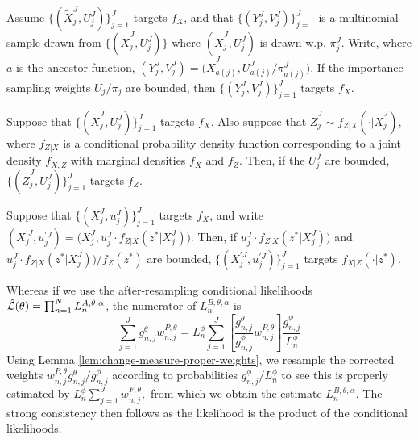 \documentclass[9pt,twoside,lineno]{pnas-new-si}
\begin{document}
\begin{lem}
    \label{lem:change-measure-proper-weights}
    Assume $\{(\tilde X_j^J,U_j^J)\}_{j=1}^J$ targets $f_X$, and that $\{(Y_j^J,V_j^J)\}_{j=1}^J$ is a multinomial sample drawn from $\{(\tilde X_j^J,U_j^J)\}$ where $(\tilde X_j^J,U_j^J)$ is drawn w.p. $\pi^J_j$. Write, where $a$ is the ancestor function,
    $(Y_j^J,V_j^J) = \big(\tilde X^J_{a(j)},U^J_{a(j)}/\pi^J_{a(j)}\big)
    $. If the importance sampling weights $U_j/\pi_j$ are bounded, then $\{(Y^J_j,V^J_j)\}_{j=1}^J$ targets $f_X$.
\end{lem}
\begin{lem}
    \label{lem:marginal-proper-weights}
    Suppose that $\{(\tilde X_j^J,U_j^J)\}_{j=1}^J$ targets $f_X$. Also suppose that $\tilde Z_j^J \sim f_{Z|X}(\cdot | \tilde X_j^J)$, where $f_{Z|X}$ is a conditional probability density function corresponding to a joint density $f_{X,Z}$ with marginal densities $f_X$ and $f_Z$. Then, if the $U_j^J$ are bounded, $\{(\tilde Z_j^J,U_j^J)\}_{j=1}^J$ targets $f_Z$.
\end{lem}
\begin{lem}
    \label{lem:posterior-proper-weights}
    Suppose that $\{(X_j^J,u_j^J)\}_{j=1}^J$ targets $f_X$, and write $(X^{\prime J}_j,u^{\prime J}_j) = \big(X_j^J,u_j^J \cdot f_{Z|X}(z^*|X_j^J)\big)$. Then, if $u_j^J \cdot f_{Z|X}(z^*|X_j^J)\big)$ and $u_j^J \cdot f_{Z|X}(z^*|X_j^J)\big) / f_Z(z^*)$ are bounded, $\{(X^{\prime J}_j,u^{\prime J}_j)\}_{j=1}^J$ targets $f_{X|Z}(\cdot | z^*)$.
\end{lem}
    
Whereas if we use the after-resampling conditional likelihoods $\hat{\mathcal{L}}(\theta) = \prod_{n=1}^N L_n^{A,\theta,\alpha}$, the numerator of $L_n^{B,\theta,\alpha}$ is
\begin{equation}
    \sum_{j=1}^J g_{n,j}^\theta w_{n, j}^{P, \theta} = L^\phi_n \sum_{j=1}^J \left[ \frac{g^\theta_{n,j}}{g^\phi_{n,j}} w^{P,\theta}_{n,j}\right] \frac{g^\phi_{n,j}}{L_n^\phi}
\end{equation}
Using Lemma \ref{lem:change-measure-proper-weights}, we resample the corrected weights $w^{P,\theta}_{n,j}{g^\theta_{n,j}}/{g^\phi_{n,j}} $ according to probabilities ${g^\phi_{n,j}}/{L_n^\phi}$ to see this is properly estimated by $L^\phi_n \sum_{j=1}^J w^{F,\theta}_{n,j},$
from which we obtain the estimate $L_n^{B,\theta,\alpha}$. The strong consistency then follows as the likelihood is the product of the conditional likelihoods.
\end{document}
